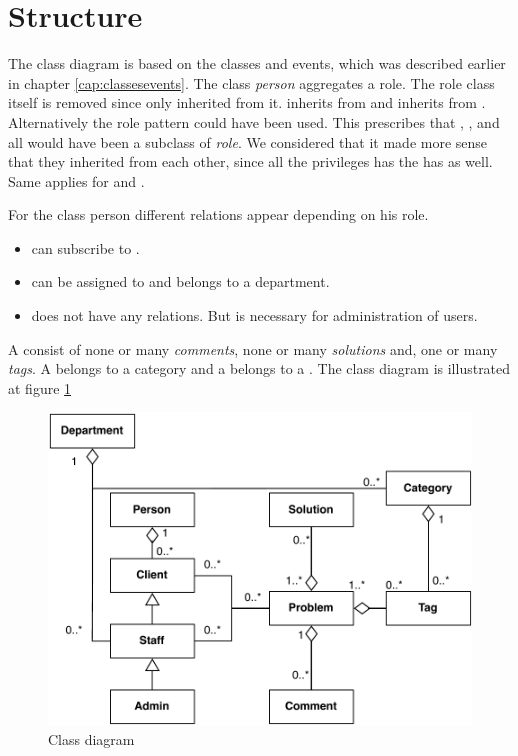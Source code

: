 \section{Structure}
\label{sec:problem_structure}
The class diagram is based on the classes and events, which was described earlier in chapter \ref{cap:classesevents}. The class \textit{person} aggregates a role. The role class itself is removed since only \class{\client[]} inherited from it. \staff[ci] inherits from \class{\client[]} and \class{\admin[]} inherits from \cl{\client[]}. Alternatively the role pattern \cite[p. 80]{roedaalborg} could have been used. This prescribes that \class{\admin[]}, \class{\client[]}, and \class{\staff[]} all would have been a subclass of \textit{role}. We considered that it made more sense that they inherited from each other, since all the privileges \class{\staff[]} has the \class{\admin[]} has as well. Same applies for \class{\staff[]} and \cl{\client[]}.  

For the class person different relations appear depending on his role. 
\begin{itemize}
\item {} can subscribe to .
\item \staff[ci] can be assigned to  and \class{\staff[]} belongs to a department. 
\item \class{\admin[]} does not have any relations. But is necessary for administration of users.  
\end{itemize}

A \problem[] consist of none or many \textit{comments}, none or many \textit{solutions} and, one or many \textit{tags}. A  belongs to a category and a  belongs to a .  The class diagram is illustrated at figure \ref{fig:pdaclassdiagram}

\begin{figure}
\begin{center}
\includegraphics[scale=0.6]{input/problem_domain_analysis/newest_class_diagram.pdf}
\caption{Class diagram}
\label{fig:pdaclassdiagram}
\end{center}
\end{figure}